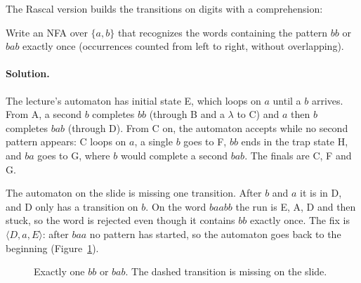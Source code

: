 The Rascal version builds the transitions on digits with a comprehension:

\begin{exercise}
Write an NFA over $\{a, b\}$ that recognizes the words containing the pattern
$bb$ or $bab$ exactly once (occurrences counted from left to right, without
overlapping).
\end{exercise}

\paragraph{Solution.} The lecture's automaton has initial state E, which loops on
$a$ until a $b$ arrives. From A, a second $b$ completes $bb$ (through B and a
$\lambda$ to C) and $a$ then $b$ completes $bab$ (through D). From C on, the
automaton accepts while no second pattern appears: C loops on $a$, a single
$b$ goes to F, $bb$ ends in the trap state H, and $ba$ goes to G, where $b$
would complete a second $bab$. The finals are C, F and G.

The automaton on the slide is missing one transition. After $b$ and $a$ it is
in D, and D only has a transition on $b$. On the word $baabb$ the run is
E, A, D and then stuck, so the word is rejected even though it contains
$bb$ exactly once. The fix is $\langle D, a, E \rangle$: after $baa$ no pattern has
started, so the automaton goes back to the beginning (Figure~\ref{fig:bbbab}).

\begin{figure}[h]
\centering
{}
\caption{Exactly one $bb$ or $bab$. The dashed transition is missing on the slide.}
\label{fig:bbbab}
\end{figure}

